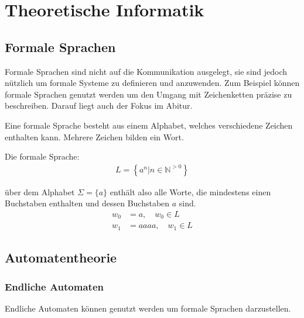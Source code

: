 \chapter{Theoretische Informatik}
\section{Formale Sprachen}
\begin{flushleft}
Formale Sprachen sind nicht auf die Kommunikation ausgelegt,
sie sind jedoch nützlich um formale Systeme zu definieren und anzuwenden.
Zum Beispiel können formale Sprachen genutzt werden um den Umgang mit
Zeichenketten präzise zu beschreiben.
Darauf liegt auch der Fokus im Abitur.

Eine formale Sprache besteht aus einem Alphabet, welches verschiedene Zeichen
enthalten kann. Mehrere Zeichen bilden ein Wort.
\end{flushleft}

\begin{flushleft}
Die formale Sprache:
\begin{align}
    L=\left\{a^n|n\in\mathbb{N}^{>0}\right\}
\end{align}

über dem Alphabet $\Sigma=\{a\}$ enthält also alle Worte,
die mindestens einen Buchstaben enthalten und dessen Buchstaben
$a$ sind.
\begin{align}
    w_0&=a,\quad w_0\in L \\
    w_1&=aaaa,\quad w_1\in L
\end{align}
\end{flushleft}

\section{Automatentheorie}
\subsection{Endliche Automaten}
\begin{flushleft}
Endliche Automaten können genutzt werden um formale Sprachen darzustellen.
\end{flushleft}

